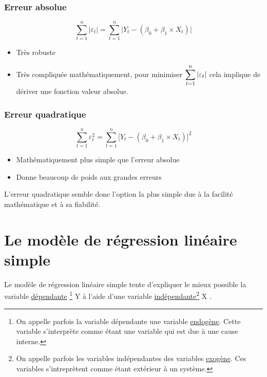 \documentclass[11pt,french]{report}
\begin{document}
\subsubsection{Erreur absolue}
\begin{equation}
\displaystyle\sum_{t=1}^n |\varepsilon_t| = \displaystyle\sum_{t=1}^n \Big| Y_t - (\beta_0 + \beta_1\times X_t) \Big| 
\end{equation}

\bigskip
\begin{itemize}
\item Très robuste
\item Très compliquée mathématiquement, pour minimiser $\displaystyle\displaystyle\sum_{t=1}^n |\varepsilon_t|$ cela implique de dériver une fonction valeur absolue.
\end{itemize}

\subsubsection{Erreur quadratique}
\begin{equation}
\displaystyle\sum_{t=1}^n \varepsilon_t^2 = \displaystyle\sum_{t=1}^n \Big[ Y_t - (\beta_0 + \beta_1\times X_t) \Big]^2 
\end{equation}

\bigskip
\begin{itemize}
\item Mathématiquement plus simple que l'erreur absolue
\item Donne beaucoup de poids aux grandes erreurs
\end{itemize}

\bigskip
L'erreur quadratique semble donc l'option la plus simple due à la facilité mathématique et à sa fiabilité.

\section{Le modèle de régression linéaire simple}
Le modèle de régression linéaire simple tente d'expliquer le mieux possible la variable \href{https://fr.wikipedia.org/wiki/Variable_dépendante}{dépendante} \footnote{On appelle parfois la variable dépendante une variable \href{https://fr.wikipedia.org/wiki/Endogène}{endogène}. Cette variable s'interprète comme étant une variable qui est due à une cause interne.}  Y à l'aide d'une variable \href{https://fr.wikipedia.org/wiki/Variable_indépendante}{indépendante}\footnote{On appelle parfois les variables indépendantes des variables \href{https://fr.wikipedia.org/wiki/Exogène}{exogène}. Ces variables s'intreprètent comme étant extérieur à un système.} X . 
\end{document}
